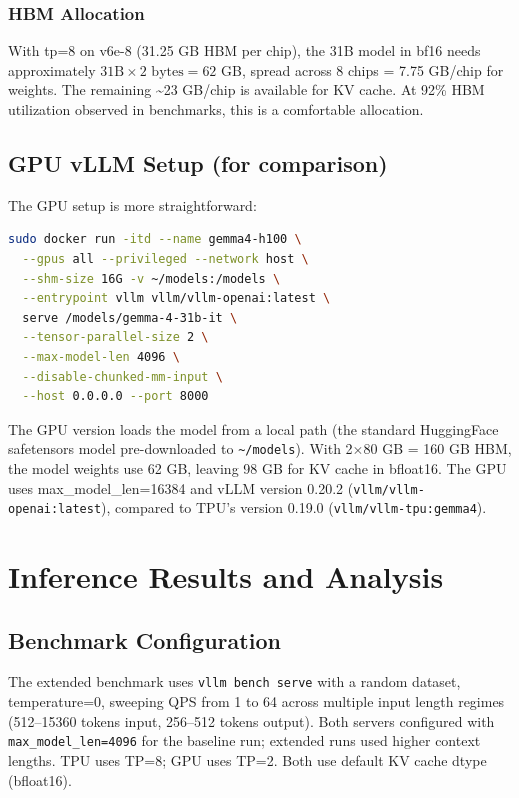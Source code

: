\documentclass[11pt,a4paper]{article}
\begin{document}
\subsubsection{HBM Allocation}

With tp=8 on v6e-8 (31.25 GB HBM per chip), the 31B model in bf16 needs approximately $31\text{B} \times 2\text{ bytes} = 62$ GB, spread across 8 chips = 7.75 GB/chip for weights. The remaining \textasciitilde23 GB/chip is available for KV cache. At 92\% HBM utilization observed in benchmarks, this is a comfortable allocation.

\subsection{GPU vLLM Setup (for comparison)}

The GPU setup is more straightforward:

\begin{lstlisting}[language=bash]
sudo docker run -itd --name gemma4-h100 \
  --gpus all --privileged --network host \
  --shm-size 16G -v ~/models:/models \
  --entrypoint vllm vllm/vllm-openai:latest \
  serve /models/gemma-4-31b-it \
  --tensor-parallel-size 2 \
  --max-model-len 4096 \
  --disable-chunked-mm-input \
  --host 0.0.0.0 --port 8000
\end{lstlisting}

The GPU version loads the model from a local path (the standard HuggingFace safetensors model pre-downloaded to \texttt{\textasciitilde/models}). With 2$\times$80 GB = 160 GB HBM, the model weights use 62 GB, leaving 98 GB for KV cache in bfloat16. The GPU uses max\_model\_len=16384 and vLLM version 0.20.2 (\texttt{vllm/vllm-openai:latest}), compared to TPU's version 0.19.0 (\texttt{vllm/vllm-tpu:gemma4}).

\section{Inference Results and Analysis}

\subsection{Benchmark Configuration}

The extended benchmark uses \texttt{vllm bench serve} with a random dataset, temperature=0, sweeping QPS from 1 to 64 across multiple input length regimes (512--15360 tokens input, 256--512 tokens output). Both servers configured with \texttt{max\_model\_len=4096} for the baseline run; extended runs used higher context lengths. TPU uses TP=8; GPU uses TP=2. Both use default KV cache dtype (bfloat16).
\end{document}
